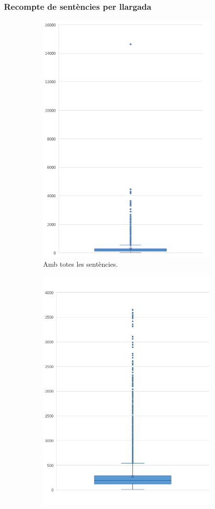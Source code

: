 \subsubsection{Recompte de sentències per llargada}
\begin{figure}[h]
  \centering
  \begin{subfigure}{.5\textwidth}
    \centering
    \includegraphics[width=.7\linewidth]{box_sent.png}
    \caption{Amb totes les sentències.}
    \label{fig:box_longitud_sentencies_tot}
  \end{subfigure}%
  \begin{subfigure}{.5\textwidth}
    \centering
    \includegraphics[width=.7\linewidth]{box_sent_out.png}

\end{subfigure}
\end{figure}
